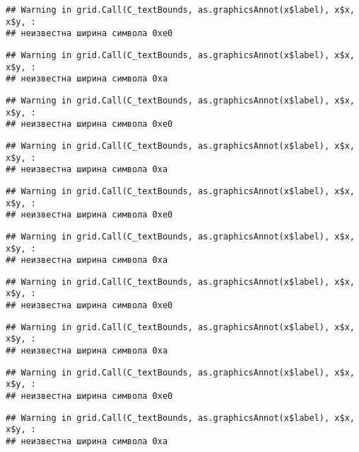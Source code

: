 \documentclass[
]{article}
\begin{document}
\begin{verbatim}
## Warning in grid.Call(C_textBounds, as.graphicsAnnot(x$label), x$x, x$y, :
## неизвестна ширина символа 0xe0
\end{verbatim}

\begin{verbatim}
## Warning in grid.Call(C_textBounds, as.graphicsAnnot(x$label), x$x, x$y, :
## неизвестна ширина символа 0xa
\end{verbatim}

\begin{verbatim}
## Warning in grid.Call(C_textBounds, as.graphicsAnnot(x$label), x$x, x$y, :
## неизвестна ширина символа 0xe0
\end{verbatim}

\begin{verbatim}
## Warning in grid.Call(C_textBounds, as.graphicsAnnot(x$label), x$x, x$y, :
## неизвестна ширина символа 0xa
\end{verbatim}

\begin{verbatim}
## Warning in grid.Call(C_textBounds, as.graphicsAnnot(x$label), x$x, x$y, :
## неизвестна ширина символа 0xe0
\end{verbatim}

\begin{verbatim}
## Warning in grid.Call(C_textBounds, as.graphicsAnnot(x$label), x$x, x$y, :
## неизвестна ширина символа 0xa
\end{verbatim}

\begin{verbatim}
## Warning in grid.Call(C_textBounds, as.graphicsAnnot(x$label), x$x, x$y, :
## неизвестна ширина символа 0xe0
\end{verbatim}

\begin{verbatim}
## Warning in grid.Call(C_textBounds, as.graphicsAnnot(x$label), x$x, x$y, :
## неизвестна ширина символа 0xa
\end{verbatim}

\begin{verbatim}
## Warning in grid.Call(C_textBounds, as.graphicsAnnot(x$label), x$x, x$y, :
## неизвестна ширина символа 0xe0
\end{verbatim}

\begin{verbatim}
## Warning in grid.Call(C_textBounds, as.graphicsAnnot(x$label), x$x, x$y, :
## неизвестна ширина символа 0xa
\end{verbatim}
\end{document}
